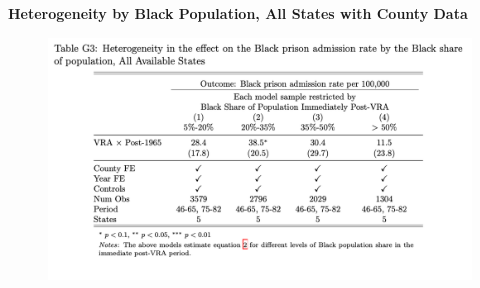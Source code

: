 \documentclass[12pt]{article}
\begin{document}


\vspace*{.1in}
\textbf{Heterogeneity by Black Population, All States with County Data}



\begin{figure}
	\centering
	\includegraphics[width=\textwidth]{../../60_appendix_cty_results/table_g3.png}
\end{figure}
\end{document}
